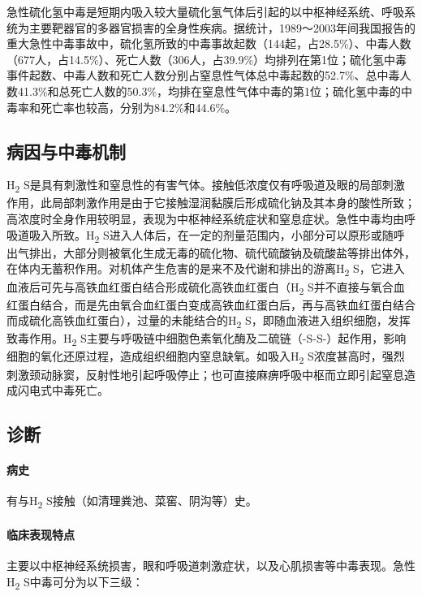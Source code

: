 急性硫化氢中毒是短期内吸入较大量硫化氢气体后引起的以中枢神经系统、呼吸系统为主要靶器官的多器官损害的全身性疾病。据统计，1989～2003年间我国报告的重大急性中毒事故中，硫化氢所致的中毒事故起数（144起，占28.5\%）、中毒人数（677人，占14.5\%）、死亡人数（306人，占39.9\%）均排列在第1位；硫化氢中毒事件起数、中毒人数和死亡人数分别占窒息性气体总中毒起数的52.7\%、总中毒人数41.3\%和总死亡人数的50.3\%，均排在窒息性气体中毒的第1位；硫化氢中毒的中毒率和死亡率也较高，分别为84.2\%和44.6\%。

\subsection{病因与中毒机制}

H\textsubscript{2}
S是具有刺激性和窒息性的有害气体。接触低浓度仅有呼吸道及眼的局部刺激作用，此局部刺激作用是由于它接触湿润黏膜后形成硫化钠及其本身的酸性所致；高浓度时全身作用较明显，表现为中枢神经系统症状和窒息症状。急性中毒均由呼吸道吸入所致。H\textsubscript{2}
S进入人体后，在一定的剂量范围内，小部分可以原形或随呼出气排出，大部分则被氧化生成无毒的硫化物、硫代硫酸钠及硫酸盐等排出体外，在体内无蓄积作用。对机体产生危害的是来不及代谢和排出的游离H\textsubscript{2}
S，它进入血液后可先与高铁血红蛋白结合形成硫化高铁血红蛋白（H\textsubscript{2}
S并不直接与氧合血红蛋白结合，而是先由氧合血红蛋白变成高铁血红蛋白后，再与高铁血红蛋白结合而成硫化高铁血红蛋白），过量的未能结合的H\textsubscript{2}
S，即随血液进入组织细胞，发挥致毒作用。H\textsubscript{2}
S主要与呼吸链中细胞色素氧化酶及二硫链（-S-S-）起作用，影响细胞的氧化还原过程，造成组织细胞内窒息缺氧。如吸入H\textsubscript{2}
S浓度甚高时，强烈刺激颈动脉窦，反射性地引起呼吸停止；也可直接麻痹呼吸中枢而立即引起窒息造成闪电式中毒死亡。

\subsection{诊断}

\paragraph{病史}

有与H\textsubscript{2} S接触（如清理粪池、菜窖、阴沟等）史。

\paragraph{临床表现特点}

主要以中枢神经系统损害，眼和呼吸道刺激症状，以及心肌损害等中毒表现。急性H\textsubscript{2}
S中毒可分为以下三级：

